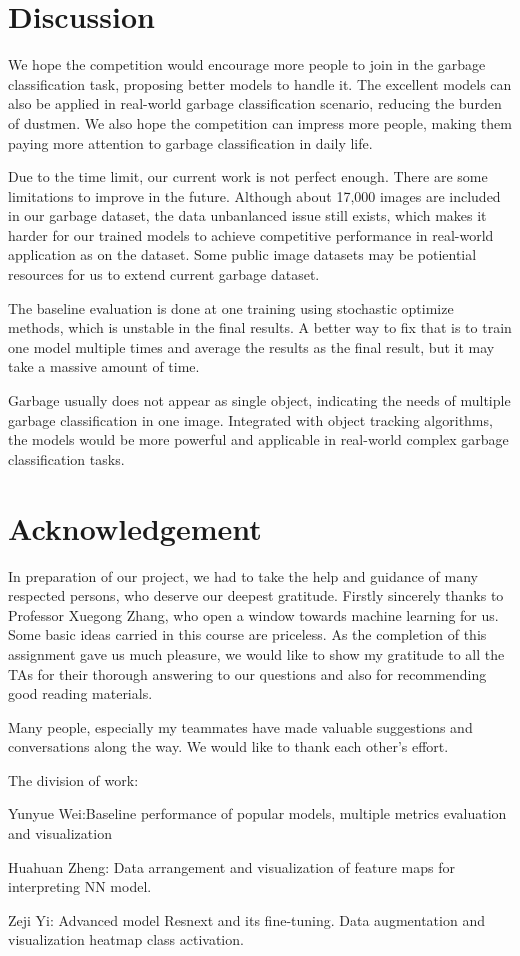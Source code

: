 \section{Discussion}

We hope the competition would encourage more people to join in the garbage classification task, proposing better models to handle it. The excellent models can also be applied in real-world garbage classification scenario, reducing the burden of dustmen. We also hope the competition can impress more people, making them paying more attention to garbage classification in daily life.

Due to the time limit, our current work is not perfect enough. There are some limitations to improve in the future. Although about 17,000 images are included in our garbage dataset, the data unbanlanced issue still exists, which makes it harder for our trained models to achieve competitive performance in real-world application as on the dataset. Some public image datasets may be potiential resources for us to extend current garbage dataset.

The baseline evaluation is done at one training using stochastic optimize methods, which is unstable in the final results. A better way to fix that is to train one model multiple times and average the results as the final result, but it may take a massive amount of time.

Garbage usually does not appear as single object, indicating the needs of multiple garbage classification in one image. Integrated with object tracking algorithms, the models would be more powerful and applicable in real-world complex garbage classification tasks. 

\section{Acknowledgement}

In preparation of our project, we had to take the help and guidance of many respected persons, who deserve our deepest gratitude. Firstly sincerely thanks to Professor Xuegong Zhang, who open a window towards machine learning for us. Some basic ideas carried in this course are priceless. As the completion of this assignment gave us much pleasure, we would like to show my gratitude to all the TAs for their thorough answering to our questions and also for recommending good reading materials.


Many people, especially my teammates have made valuable suggestions and conversations along the way. We would like to thank each other's effort.

The division of work:

Yunyue Wei:Baseline performance of popular models, multiple metrics evaluation and visualization

Huahuan Zheng: Data arrangement and visualization of feature maps for interpreting NN model.

Zeji Yi: Advanced model Resnext and its fine-tuning. Data augmentation and visualization heatmap class activation.